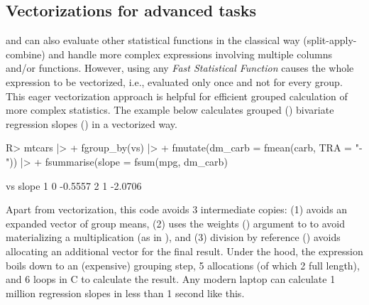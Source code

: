 \documentclass[article]{jss}
\newcommand{\fct}[1]{\code{#1()}}
\begin{document}
\subsection{Vectorizations for advanced tasks}
%
\fct{fsummarise} and \fct{fmutate} can also evaluate other statistical functions in the classical way (split-apply-combine) and handle more complex expressions involving multiple columns and/or functions. However, using any \emph{Fast Statistical Function} causes the whole expression to be vectorized, i.e., evaluated only once and not for every group. This eager vectorization approach is helpful for efficient grouped calculation of more complex statistics. The example below calculates grouped () bivariate regression slopes () in a vectorized way.
%
\begin{Schunk}
\begin{Sinput}
R> mtcars |>
+   fgroup_by(vs) |>
+   fmutate(dm_carb = fmean(carb, TRA = "-")) |>
+   fsummarise(slope = fsum(mpg, dm_carb) %/=% fsum(dm_carb^2))
\end{Sinput}
\begin{Soutput}
  vs   slope
1  0 -0.5557
2  1 -2.0706
\end{Soutput}
\end{Schunk}
%
Apart from vectorization, this code avoids 3 intermediate copies: (1)  avoids an expanded vector of group means, (2)  uses the weights () argument to \fct{fsum} to avoid materializing a multiplication (as in ), and (3) division by reference (\code{\%/=\%}) avoids allocating an additional vector for the final result. Under the hood, the expression boils down to an (expensive) grouping step, 5 allocations (of which 2 full length), and 6 loops in C to calculate the result. Any modern laptop can calculate 1 million regression slopes in less than 1 second like this. \newline
\end{document}
